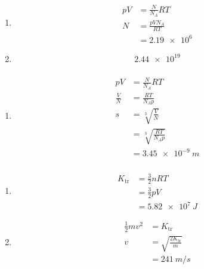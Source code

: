 \documentclass{article}
\begin{document}
\begin{enumerate}
  \item

        \begin{align*}
          p V & = \frac{N}{N_A} R T   \\
          N   & = \frac{p V N_A}{R T} \\
              & = \num{2.19e6}
        \end{align*}

  \item \[\num{2.44e19}\]
\end{enumerate}

\setcounter{subsubsection}{22}
\subsubsection{}

\begin{enumerate}
  \item

        \begin{align*}
          p V         & = \frac{N}{N_A} R T           \\
          \frac{V}{N} & = \frac{R T}{N_A p}           \\
          s           & = \sqrt[3]{\frac{V}{N}}       \\
                      & = \sqrt[3]{\frac{R T}{N_A p}} \\
                      & = \qty{3.45e-9}{m}
        \end{align*}
\end{enumerate}

\setcounter{subsubsection}{24}
\subsubsection{}

\begin{enumerate}
  \item

        \begin{align*}
          K_\text{tr} & = \frac{3}{2} n R T \\
                      & = \frac{3}{2} p V   \\
                      & = \qty{5.82e7}{J}
        \end{align*}

  \item

        \begin{align*}
          \frac{1}{2} m v^2 & = K_\text{tr}                    \\
          v                 & = \sqrt{\frac{2 K_\text{tr}}{m}} \\
                            & = \qty{241}{m/s}
        \end{align*}
\end{enumerate}
\end{document}
